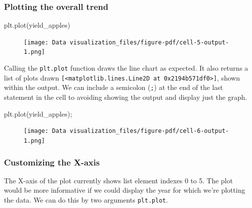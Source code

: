 \documentclass[
  letterpaper,
  DIV=11,
  numbers=noendperiod]{scrreprt}
\newenvironment{Shaded}{\begin{snugshade}}{\end{snugshade}}
\newcommand{\NormalTok}[1]{\textcolor[rgb]{0.00,0.23,0.31}{#1}}
\newcommand{\OperatorTok}[1]{\textcolor[rgb]{0.37,0.37,0.37}{#1}}
\begin{document}
\hypertarget{plotting-the-overall-trend}{%
\subsubsection{Plotting the overall
trend}\label{plotting-the-overall-trend}}

\begin{Shaded}
\begin{Highlighting}[]
\NormalTok{plt.plot(yield\_apples)}
\end{Highlighting}
\end{Shaded}

\begin{figure}[H]

{\centering \texttt{[image: Data visualization\_files/figure-pdf/cell-5-output-1.png]}

}

\end{figure}

Calling the \texttt{plt.plot} function draws the line chart as expected.
It also returns a list of plots drawn
\texttt{{[}\textless{}matplotlib.lines.Line2D\ at\ 0x2194b571df0\textgreater{}{]}},
shown within the output. We can include a semicolon (\texttt{;}) at the
end of the last statement in the cell to avoiding showing the output and
display just the graph.

\begin{Shaded}
\begin{Highlighting}[]
\NormalTok{plt.plot(yield\_apples)}\OperatorTok{;}
\end{Highlighting}
\end{Shaded}

\begin{figure}[H]

{\centering \texttt{[image: Data visualization\_files/figure-pdf/cell-6-output-1.png]}

}

\end{figure}

\hypertarget{customizing-the-x-axis}{%
\subsubsection{Customizing the X-axis}\label{customizing-the-x-axis}}

The X-axis of the plot currently shows list element indexes 0 to 5. The
plot would be more informative if we could display the year for which
we're plotting the data. We can do this by two arguments
\texttt{plt.plot}.
\end{document}
